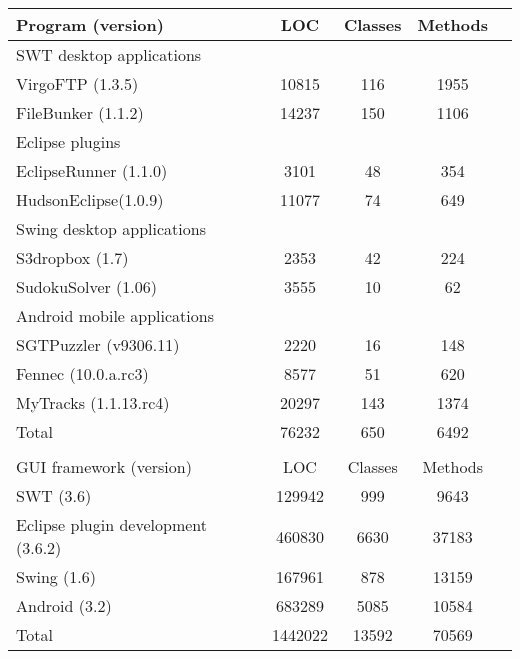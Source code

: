 \begin{table}[t]
\begin{center}
 \fontsize{9pt}{\baselineskip}\selectfont
\hspace*{-0.2cm}
\setlength{\tabcolsep}{.70\tabcolsep}
\begin{tabular}{|p{4.4cm}||c|c|c|c|}
\hline
 Program (version) & LOC & Classes & Methods \\
\hline \hline
\multicolumn{4}{|l|}{SWT desktop applications}   \\
 \hline
 VirgoFTP (1.3.5) &  10815 &  116 &  1955\\
 \hline
 FileBunker (1.1.2)&  14237 &  150 &  1106  \\
 \hline
 \hline
\multicolumn{4}{|l|}{Eclipse plugins}   \\
 \hline
 EclipseRunner (1.1.0) &  3101 &  48 &  354\\
 \hline
 HudsonEclipse(1.0.9)&  11077 &  74 &  649 \\
 \hline
 \hline
\multicolumn{4}{|l|}{Swing desktop applications}   \\
 \hline
 S3dropbox (1.7) &  2353 &  42  &  224 \\
 \hline
 SudokuSolver (1.06)&  3555 &  10 &  62 \\
 \hline
 \hline
\multicolumn{4}{|l|}{Android mobile applications}   \\
 \hline
 SGTPuzzler (v9306.11)&  2220 &  16 &  148 \\
 \hline
 Fennec (10.0.a.rc3)&  8577 &  51 &  620 \\
 \hline
 MyTracks (1.1.13.rc4)&  20297 &  143 &  1374 \\
\hline
\hline
 Total &  76232 &  650 &  6492\\
\hline
\multicolumn{4}{l}{}   \\
\hline
 GUI framework (version) & LOC & Classes & Methods  \\
\hline \hline
 SWT (3.6)&  129942 &  999 &  9643 \\
\hline
 Eclipse plugin development (3.6.2)&  460830 &  6630 &  37183 \\
\hline
Swing (1.6)&  167961 &  878 &  13159 \\
\hline
 Android (3.2)&  683289 &  5085 &  10584 \\
\hline
\hline
 Total &  1442022 &  13592 &  70569\\
\hline
\end{tabular}

\end{center}
\vspace{-15pt}
\end{table}


